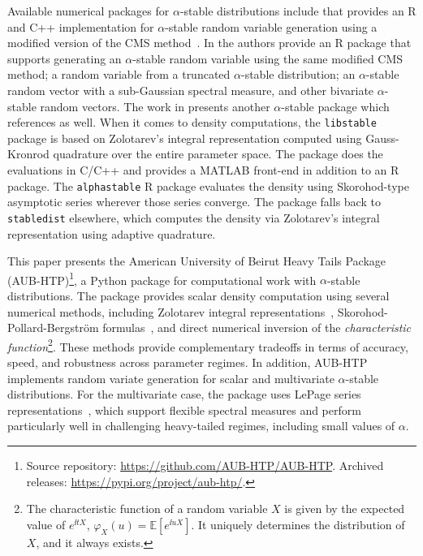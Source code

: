 Available numerical packages for $\alpha$-stable distributions include \cite{Royuela-del-ValJavier2017l:FP} that provides an R and C++ implementation for $\alpha$-stable random variable generation using a modified version of the CMS method~\citep{ChambersJ.M.1976AMfS,NolanJohnP2020USDM}. In \cite{teimouri2018alphastablerpackagemodelling} the authors provide an R package that supports generating an $\alpha$-stable random variable using the same modified CMS method; a random variable from a truncated $\alpha$-stable distribution; an $\alpha$-stable random vector with a sub-Gaussian spectral measure, and other bivariate $\alpha$-stable random vectors. The work in \cite{RJ-2022-056} presents another $\alpha$-stable package which references \cite{teimouri2018alphastablerpackagemodelling} as well. When it comes to density computations, the \texttt{libstable} package \citep{Royuela-del-ValJavier2017l:FP} is based on Zolotarev's integral representation \citep{Zolotarev1986} computed using Gauss-Kronrod quadrature over the entire parameter space. The package does the evaluations in C/C++ and provides a MATLAB front-end in addition to an R package. The \texttt{alphastable} R package \citep{teimouri2018alphastablerpackagemodelling} evaluates the density using Skorohod-type asymptotic series \citep{sko2,Pollard1946LaplaceIntegral,Bergstrom1952ExpansionsStable} wherever those series converge. The package falls back to \texttt{stabledist} \citep{Wuertz2016Stabledist} elsewhere, which computes the density via Zolotarev's integral representation \citep{Zolotarev1986} using adaptive quadrature.

This paper presents the American University of Beirut Heavy Tails Package (AUB-HTP)\footnote{Source repository: \url{https://github.com/AUB-HTP/AUB-HTP}. Archived releases: \url{https://pypi.org/project/aub-htp/}.}, a Python package for computational work with $\alpha$-stable distributions. The package provides scalar density computation using several numerical methods, including Zolotarev integral representations~\citep{Zolotarev1986}, Skorohod-Pollard-Bergstr{\"o}m formulas~\citep{sko2,Pollard1946LaplaceIntegral,Bergstrom1952ExpansionsStable}, and direct numerical inversion of the \textit{characteristic function}\footnote{The characteristic function of a random variable $X$ is given by the expected value of $e^{\ii tX}$,
\(
\varphi_X(u) = \mathbb{E}[e^{\ii uX}].
\)
It uniquely determines the distribution of $X$, and it always exists.}. These methods provide complementary tradeoffs in terms of accuracy, speed, and robustness across parameter regimes. In addition, AUB-HTP implements random variate generation for scalar and multivariate $\alpha$-stable distributions. For the multivariate case, the package uses LePage series representations~\citep{LePageRaoul1981CtaS}, which support flexible spectral measures and perform particularly well in challenging heavy-tailed regimes, including small values of $\alpha$.

